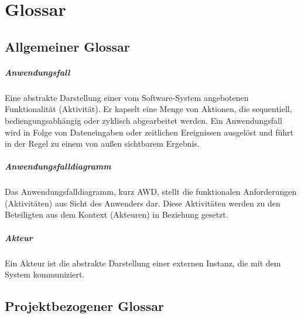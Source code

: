 \chapter{Glossar}

\section{Allgemeiner Glossar}
\paragraph{Anwendungsfall}
Eine abstrakte Darstellung einer vom Software-System angebotenen Funktionalität (Aktivität). Er kapselt eine Menge von Aktionen, die sequentiell, bediengungsabhängig oder zyklisch abgearbeitet werden. Ein Anwendungsfall wird in Folge von Dateneingaben oder zeitlichen Ereignissen ausgelöst und führt in der Regel zu einem von au{\ss}en sichtbarem Ergebnis.

\paragraph{Anwendungsfalldiagramm}
Das Anwendungsfalldiagramm, kurz AWD, stellt die funktionalen Anforderungen (Aktivitäten) aus Sicht des Anwenders dar. Diese Aktivitäten werden zu den Beteiligten aus dem Kontext (Akteuren) in Beziehung gesetzt.

\paragraph{Akteur}
Ein Akteur ist die abstrakte Darstellung einer externen Instanz, die mit dem System kommuniziert.

\section{Projektbezogener Glossar}


